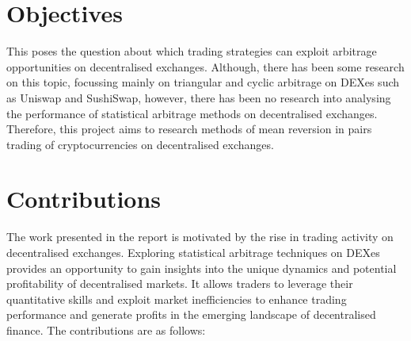 \section{Objectives}
This poses the question about which trading strategies can exploit arbitrage opportunities on decentralised exchanges. Although, there has been some research on this topic, focussing mainly on triangular and cyclic arbitrage on DEXes such as Uniswap and SushiSwap, however, there has been no research into analysing the performance of statistical arbitrage methods on decentralised exchanges. Therefore, this project aims to research methods of mean reversion in pairs trading of cryptocurrencies on decentralised exchanges.

\section{Contributions}
The work presented in the report is motivated by the rise in trading activity on decentralised exchanges. Exploring statistical arbitrage techniques on DEXes provides an opportunity to gain insights into the unique dynamics and potential profitability of decentralised markets. It allows traders to leverage their quantitative skills and exploit market inefficiencies to enhance trading performance and generate profits in the emerging landscape of decentralised finance. The contributions are as follows:

